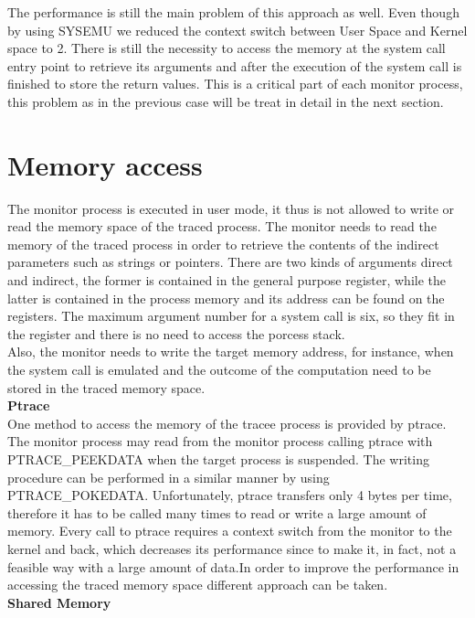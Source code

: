 The performance is still the main problem of this approach as well.   Even though by using SYSEMU we reduced the context switch between User Space and Kernel space to 2. There is still the necessity   to access the memory at the system call entry point to retrieve its arguments and after the execution of the system call is finished to store the return values. This is a critical part of each monitor process, this problem as in the previous case will be treat in detail in the next section. \\

\section{Memory access}
The monitor process is executed in user mode, it thus is not allowed to write or read the memory space of the traced process. The monitor needs to read the memory of the traced process in order to retrieve the contents of the indirect parameters such as strings or pointers.
There are two kinds of arguments direct and indirect, the former is contained in the general purpose register, while the latter is contained in the process memory and its address can be found on the registers. The maximum argument number for a system call is six, so they fit in the register and there is no need to access the porcess stack.\\ Also, the monitor needs to write the target memory address, for instance, when the system call is emulated and the outcome of the computation need to be stored in the traced memory space.\\
\textbf{Ptrace}\\
One method to access the memory of the tracee process is provided by ptrace. The monitor process may read from the monitor process calling ptrace with PTRACE\_PEEKDATA when the target process is suspended. The writing procedure can be performed in a similar manner by using PTRACE\_POKEDATA. Unfortunately, ptrace transfers only 4 bytes per time, therefore it has to be called many times to read or write a large amount of memory. Every call to ptrace requires a context switch from the monitor to the kernel and back, which decreases its performance since to make it, in fact, not a feasible way with a large amount of data.In order to improve the performance in accessing the traced memory space different approach can be taken.\\
\textbf{Shared Memory}\\
